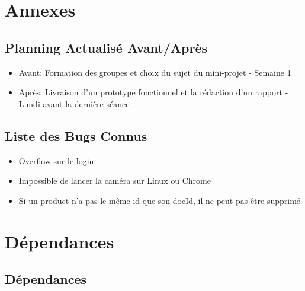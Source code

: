 \section{Annexes}

\subsection{Planning Actualisé Avant/Après}

\begin{itemize}[noitemsep]
    \item Avant: Formation des groupes et choix du sujet du mini-projet - Semaine 1
    \item Après: Livraison d’un prototype fonctionnel et la rédaction d’un rapport - Lundi avant la dernière séance
\end{itemize}

\subsection{Liste des Bugs Connus}

\begin{itemize}[noitemsep]
    \item Overflow sur le login
    \item Impossible de lancer la caméra sur Linux ou Chrome
    \item Si un product n'a pas le même id que son docId, il ne peut pas être supprimé
\end{itemize}

\section*{Dépendances}

\subsection{Dépendances}


